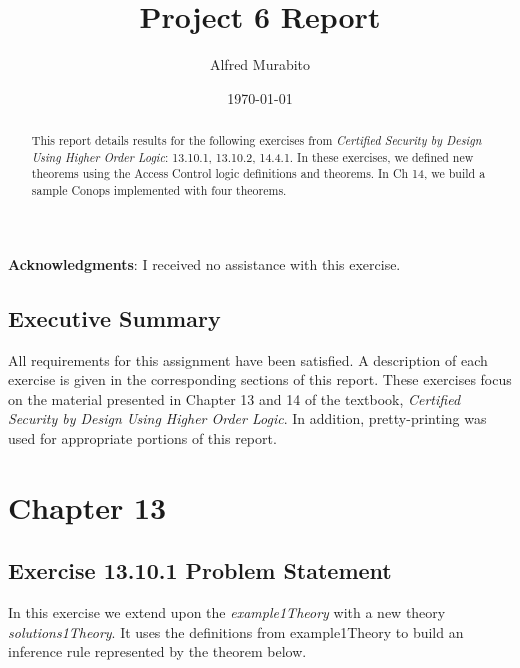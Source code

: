 \documentclass[11pt, twoside]{article}
\title{Project 6 Report}
\author{Alfred Murabito}
\date{\today}
\begin{document}
\maketitle{}

\newpage

\begin{abstract}
This report details results for the following exercises from
\textit{Certified Security by Design Using Higher Order Logic}:
13.10.1, 13.10.2, 14.4.1. In these exercises, we 
defined new theorems using the Access Control logic definitions
and theorems. In Ch 14, we build a sample Conops implemented with
four theorems.
\end{abstract}

\newpage

\textbf{Acknowledgments}: I received no assistance with this exercise.

\newpage

\tableofcontents

\newpage

\section{Executive Summary}
\label{sec:executive-summary}

All requirements for this assignment have been satisfied. A description of each exercise is given in the corresponding sections of this report.  These exercises focus on the material presented in Chapter 13 and 14 of the textbook, \textit{Certified Security by Design Using Higher Order Logic}.  In addition, pretty-printing was used for appropriate portions of this report.

\newpage

\chapter{Chapter 13}
\label{cha:chapter-13}

\section{Exercise 13.10.1 Problem Statement}
\label{sec:exerc-13.10.1-probl}

In this exercise we extend upon the \textit{example1Theory} with a new theory \textit{solutions1Theory}.
It uses the definitions from example1Theory to build an inference rule represented by the 
theorem below.  

\HOLsolutionsOneTheoremsaclExerciseOne
\end{document}
